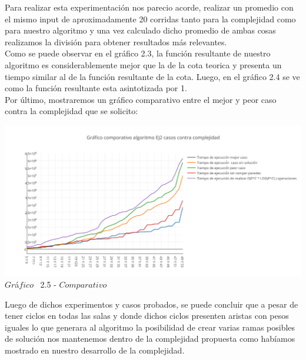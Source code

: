 Para realizar esta experimentaci\'on nos parecio acorde, realizar un promedio con el mismo input de aproximadamente 20 corridas
tanto para la complejidad como para nuestro algoritmo y una vez calculado dicho promedio de ambas cosas realizamos la divisi\'on para
obtener resultados m\'as relevantes.\\ 

Como se puede observar en el gr\'afico 2.3, la funci\'on resultante de nuestro algoritmo es considerablemente mejor que la de la cota teorica  y presenta un tiempo similar al de la funci\'on resultante de la cota.
Luego, en el gr\'afico 2.4 se ve como la función resultante esta asintotizada por 1.\\

Por \'ultimo, mostraremos un gr\'afico comparativo entre el mejor y peor caso contra la complejidad que se solicito:\\

\vspace*{0.3cm} \vspace*{0.3cm}
  \begin{center}
\includegraphics[scale=0.65]{./EJ2/comparativo1.png}
 {$Gr$\'a$fico$ \ 2.5 - $Comparativo$}
  \end{center}
  \vspace*{0.3cm}
  
Luego de dichos experimentos y casos probados, se puede concluir que a pesar de tener ciclos en todas las salas y donde dichos ciclos presenten aristas con pesos iguales lo que generara al algoritmo la posibilidad de crear varias ramas posibles de soluci\'on nos mantenemos dentro de la complejidad propuesta como hab\'iamos mostrado en nuestro desarrollo de la complejidad.\\
